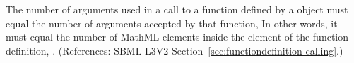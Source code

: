 The number of arguments used in a call to a function defined by a
\FunctionDefinition object must equal the number of arguments accepted by
that function,   In other words, it must equal the number of MathML
 elements inside the  element of the function
definition, .  (References: SBML L3V2
Section~\ref{sec:functiondefinition-calling}.)
